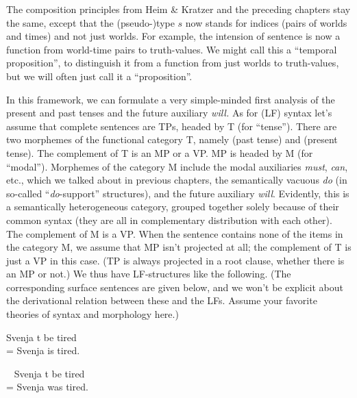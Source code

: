The composition principles from Heim \& Kratzer and the preceding chapters stay
the same, except that the (pseudo-)type $s$ now stands for indices (pairs of
worlds and times) and not just worlds. For example, the intension of sentence is
now a function from world-time pairs to truth-values. %
%
We might call this a ``temporal proposition'', to distinguish it from a function
from just worlds to truth-values, but we will often just call it a
``proposition''.

In this framework, we can formulate a very simple-minded first analysis of the
present and past tenses and the future auxiliary \emph{will.} As for (LF) syntax
let’s assume that complete sentences are TPs, headed by T (for ``tense''). There
are two morphemes of the functional category T, namely \past (past tense) and
\pres (present tense). The complement of T is an MP or a VP. MP is headed by M
(for ``modal''). Morphemes of the category M include the modal auxiliaries
\emph{must}, \emph{can}, etc., which we talked about in previous chapters, the
semantically vacuous \emph{do} (in so-called ``\emph{do}-support'' structures),
and the future auxiliary \emph{will}. Evidently, this is a semantically
heterogeneous category, grouped together solely because of their common syntax
(they are all in complementary distribution with each other). The complement of
M is a VP. When the sentence contains none of the items in the category M, we
assume that MP isn’t projected at all; the complement of T is just a VP in this
case. %
%
(TP is always projected in a root clause, whether there is an MP or not.) We
thus have LF-structures like the following. (The corresponding surface sentences
are given below, and we won’t be explicit about the derivational relation
between these and the LFs. Assume your favorite theories of syntax and
morphology here.)

\ex \lb[TP] Svenja \lb[T$'$] \pres \lb[VP] t \lb[V$'$] be tired \rb \rb \rb \rb\\
= Svenja is tired.\label{ex:is-tired} \xe

\ex~ \lb[TP] Svenja \lb[T$'$] \past \lb[VP] t \lb[V$'$] be tired \rb \rb \rb \rb\\
= Svenja was tired.\label{ex:was-tired} \xe

